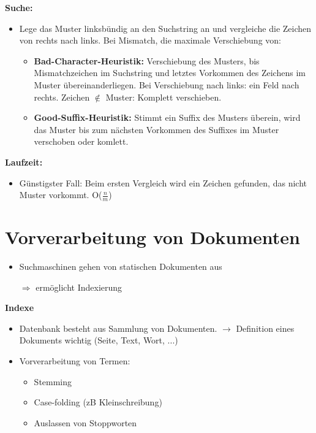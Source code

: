 \documentclass{article}
\begin{document}
\textbf{Suche:}
\begin{itemize}
\item Lege das Muster linksbündig an den Suchstring an und vergleiche die Zeichen von rechts nach links. Bei Mismatch, die maximale Verschiebung von:
\begin{itemize}
\item \textbf{Bad-Character-Heuristik:} Verschiebung des Musters, bis Mismatchzeichen im Suchstring und letztes Vorkommen des Zeichens im Muster übereinanderliegen. Bei Verschiebung nach links: ein Feld nach rechts. Zeichen $\notin$ Muster: Komplett verschieben.
\item \textbf{Good-Suffix-Heuristik:} Stimmt ein Suffix des Musters überein, wird das Muster bis zum nächsten Vorkommen des Suffixes im Muster verschoben oder komlett. 
\end{itemize}
\end{itemize}

\textbf{Laufzeit:} 
\begin{itemize}
\item Günstigster Fall: Beim ersten Vergleich wird ein Zeichen gefunden, das nicht Muster vorkommt. O($\frac{n}{m}$)

\end{itemize}

\newpage
\section{Vorverarbeitung von Dokumenten}
\begin{itemize}
\item Suchmaschinen gehen von statischen Dokumenten aus
\item[$\Rightarrow$] ermöglicht Indexierung
\end{itemize}
\textbf{Indexe}
\begin{itemize}
\item Datenbank besteht aus Sammlung von Dokumenten. $\rightarrow$ Definition eines Dokuments wichtig (Seite, Text, Wort, ...)
\item Vorverarbeitung von Termen:
\begin{itemize}
\item Stemming 
\item Case-folding (zB Kleinschreibung)
\item Auslassen von Stoppworten
\end{itemize}

\end{itemize}
\end{document}
